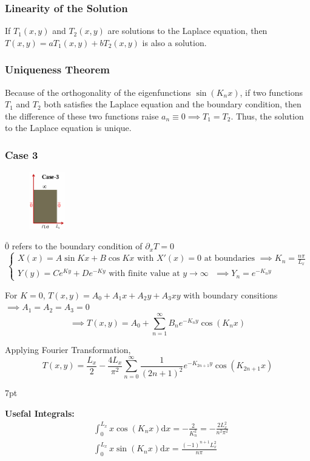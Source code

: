 \documentclass[10pt]{article}
\newcommand{\dd}{\mathrm{d}}
\newenvironment{formal}[2]{%
	\def\FrameCommand{%
		\hspace{1pt}%
		{\color{#1}\vrule width 2pt}%
		{\color{#2}\vrule width 4pt}%
		\colorbox{#2}%
	}%
	\MakeFramed{\advance\hsize-\width\FrameRestore}%
	\noindent\hspace{-4.55pt}%
	\begin{adjustwidth}{}{7pt}%
		\vspace{2pt}\vspace{2pt}%
	}
	{%
		\vspace{2pt}\end{adjustwidth}\endMakeFramed%
}
\begin{document}
\subsubsection*{Linearity of the Solution}
If $T_1(x,y)$ and $T_2(x,y)$ are solutions to the Laplace equation, then $T(x,y) = aT_1(x,y) + bT_2(x,y)$ is also a solution.

\subsubsection*{Uniqueness Theorem}
Because of the orthogonality of the eigenfunctions $\sin(K_n x)$, if two functions $T_1$ and $T_2$ both satisfies the Laplace equation and the boundary condition,
then the difference of these two functions raise $a_n \equiv 0 \implies T_1 = T_2$. Thus, the solution to the Laplace equation is unique.

\subsubsection*{Case 3}
\begin{figure}
	\centering
	\includegraphics[width=0.14\textwidth]{img5-3}
\end{figure}

$\bar{0}$ refers to the boundary condition of $\partial_x T = 0$
\[
\begin{cases}
	X(x) = A \sin Kx + B \cos Kx \text{ with $X'(x) = 0$ at boundaries } \implies K_n = \frac{n\pi}{L_x}\\
	Y(y) = C e^{Ky} + D e^{-Ky} \text{ with finite value at $y\to\infty$ } \implies Y_n = e^{-K_n y}
\end{cases}
\]

For $K=0$, $T(x,y) = A_0 + A_1 x + A_2 y + A_3 xy$ with boundary consitions $\implies A_1 = A_2 = A_3 = 0$
\[
\implies T(x,y) = A_0 + \sum_{n=1}^\infty B_n e^{-K_n y} \cos(K_n x)
\]

Applying Fourier Transformation,
\[
T(x,y) = \frac{L_x}{2} - \frac{4L_x}{\pi^2} \sum_{n=0}^\infty \frac{1}{(2n+1)^2} e^{-K_{2n+1}y} \cos(K_{2n+1}x)
\]

\begin{formal}{Blue}{blueshade}
	\textbf{Usefal Integrals:}
	\[
	\begin{aligned}
		&\int_0^{L_x} x\cos(K_n x) \dd x = -\frac{2}{K_n^2} = -\frac{2L_x^2}{n^2\pi^2}\\
		&\int_0^{L_x} x\sin(K_n x) \dd x = \frac{(-1)^{n+1} L_x^2}{n\pi}
	\end{aligned}
	\]
\end{formal}
\end{document}
